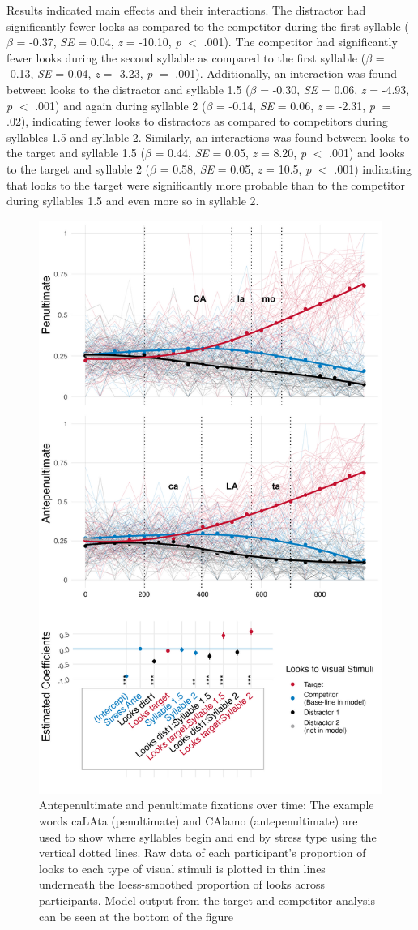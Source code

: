 Results indicated main effects and their interactions. The distractor had significantly fewer looks as compared to the competitor during the first syllable ($\beta$ = -0.37, \textit{SE} = 0.04, \textit{z} = -10.10, \textit{p} $<$ .001). The competitor had significantly fewer looks during the second syllable as compared to the first syllable  ($\beta$ = -0.13, \textit{SE} = 0.04, \textit{z} = -3.23, \textit{p} $=$ .001). Additionally, an interaction was found between looks to the distractor and syllable 1.5 ($\beta$ = -0.30, \textit{SE} = 0.06, \textit{z} = -4.93, \textit{p} $<$ .001) and again during syllable 2 ($\beta$ = -0.14, \textit{SE} = 0.06, \textit{z} = -2.31, \textit{p} $=$ .02), indicating fewer looks to distractors as compared to competitors during syllables 1.5 and syllable 2. Similarly, an interactions was found between looks to the target and syllable 1.5 ($\beta$ = 0.44, \textit{SE} = 0.05, \textit{z} = 8.20, \textit{p} $<$ .001) and looks to the target and syllable 2 ($\beta$ = 0.58, \textit{SE} = 0.05, \textit{z} = 10.5, \textit{p} $<$ .001) indicating that looks to the target were significantly more probable than to the competitor during syllables 1.5 and even more so in syllable 2.  

\begin{figure}[H]
  \centering
  \includegraphics[width=0.6\linewidth]{visuals/pen_vs_anti_pen_id_combo.jpeg} %
  \caption{Antepenultimate and penultimate fixations over time: The example words caLAta (penultimate) and CAlamo (antepenultimate) are used to show where syllables begin and end by stress type using the vertical dotted lines. Raw data of each participant's proportion of looks to each type of visual stimuli is plotted in thin lines underneath the loess-smoothed proportion of looks across participants. Model output from the target and competitor analysis can be seen at the bottom of the figure}
  \label{fig:raw_pen_vs_anti}
\end{figure}

